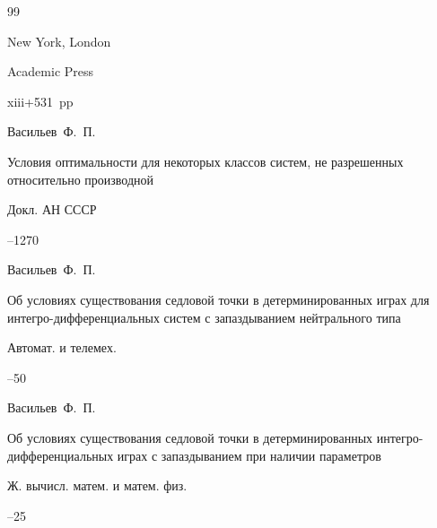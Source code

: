 \begin{thebibliography}{99}

\publaddr New York, London

\publ Academic Press


\totalpages xiii+531~pp \nofrills





\by Васильев~Ф.~П.

\paper Условия оптимальности для некоторых классов систем, не разрешенных относительно производной

\jour Докл. АН СССР




--1270







\by Васильев~Ф.~П.

\paper Об условиях существования седловой точки в детерминированных играх для интегро-дифференциальных систем с запаздыванием нейтрального типа

\jour Автомат. и телемех.



--50





\by Васильев~Ф.~П. 

\paper Об условиях существования седловой точки в детерминированных интегро-дифференциальных играх с запаздыванием при наличии параметров

\jour Ж. вычисл. матем. и матем. физ.




--25




\end{thebibliography}
